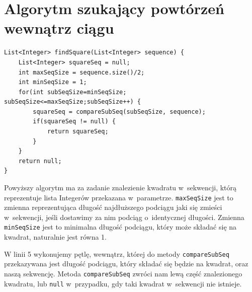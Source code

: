 \documentclass[document]{xmgr}
\begin{document}
\section{Algorytm szukający powtórzeń wewnątrz ciągu}






\begin{lstlisting}[frame=single]
List<Integer> findSquare(List<Integer> sequence) {
	List<Integer> squareSeq = null;
	int maxSeqSize = sequence.size()/2;
	int minSeqSize = 1;
	for(int subSeqSize=minSeqSize; subSeqSize<=maxSeqSize;subSeqSize++) {
		squareSeq = compareSubSeq(subSeqSize, sequence);
		if(squareSeq != null) {
			return squareSeq;
		}
	}
	return null;
}
\end{lstlisting}

Powyższy algorytm ma za zadanie znalezienie kwadratu w~sekwencji, którą reprezentuje lista Integerów przekazana w~parametrze. \mbox{\texttt{maxSeqSize}} jest to zmienna reprezentująca długość najdłuższego podciągu jaki się zmieści w~sekwencji, jeśli dostawimy za nim podciąg o~identycznej długości. Zmienna \mbox{\texttt{minSeqSize}} jest to minimalna długość podciągu, który może składać się na kwadrat, naturalnie jest równa 1. 

W linii 5 wykonujemy pętlę, wewnątrz, której do metody \texttt{compareSubSeq} przekazywana jest długość podciągu, który składać się będzie na kwadrat, oraz naszą sekwencję. Metoda \texttt{compareSubSeq} zwróci nam lewą część znalezionego kwadratu, lub \texttt{null} w~przypadku, gdy taki kwadrat w~sekwencji nie istnieje.
\end{document}
